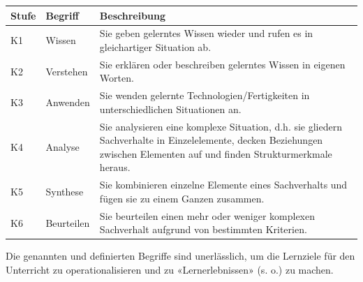 \documentclass[
11pt,
captions=tableheading,
smallheadings,
headsepline,
footsepline, 
parskip=half-,
]{scrartcl}
\begin{document}
\begin{table}[H]
    \centering
    \caption{Kognitive Taxonomiestufen nach Bloom \cite{bloom1956taxonomy}, adaptiert von \cite{BerufspädagogischesKonzept_BauschuleAarau}.}
    \begin{longtable}{@{}llp{12.5cm}@{}}
        \toprule
        \textbf{Stufe} & \textbf{Begriff} & \textbf{Beschreibung}                                                                                                                                                    \\
        \midrule
        K1              & Wissen           & Sie geben gelerntes Wissen wieder und rufen es in gleichartiger Situation ab.                                                                                            \\
        K2              & Verstehen        & Sie erklären oder beschreiben gelerntes Wissen in eigenen Worten.                                                                                                        \\
        K3              & Anwenden         & Sie wenden gelernte Technologien/Fertigkeiten in unterschiedlichen Situationen an.                                                                                       \\
        K4              & Analyse          & Sie analysieren eine komplexe Situation, d.h. sie gliedern Sachverhalte in Einzelelemente, decken Beziehungen zwischen Elementen auf und finden Strukturmerkmale heraus. \\
        K5              & Synthese         & Sie kombinieren einzelne Elemente eines Sachverhalts und fügen sie zu einem Ganzen zusammen.                                                                             \\
        K6              & Beurteilen       & Sie beurteilen einen mehr oder weniger komplexen Sachverhalt aufgrund von bestimmten Kriterien.                                                                          \\
        \bottomrule
    \end{longtable}
    \label{tab:Bloom}
\end{table}

Die  genannten und definierten Begriffe sind unerlässlich, um die Lernziele für den Unterricht zu operationalisieren und zu «Lernerlebnissen» (s. o.) zu machen.
\end{document}
